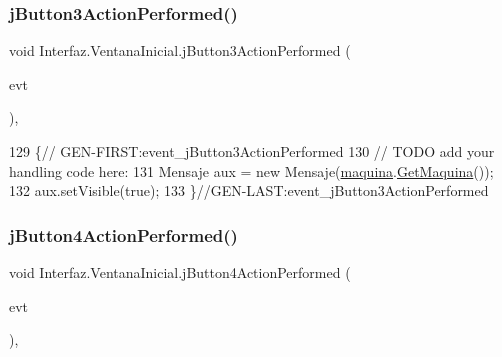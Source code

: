 \subsubsection{\texorpdfstring{j\+Button3\+Action\+Performed()}{jButton3ActionPerformed()}}
{\footnotesize\ttfamily void Interfaz.\+Ventana\+Inicial.\+j\+Button3\+Action\+Performed (\begin{DoxyParamCaption}\item[{java.\+awt.\+event.\+Action\+Event}]{evt }\end{DoxyParamCaption})\hspace{0.3cm}{\ttfamily [inline]}, {\ttfamily [private]}}


\begin{DoxyCode}
129                                                                          \{\textcolor{comment}{//
      GEN-FIRST:event\_jButton3ActionPerformed}
130         \textcolor{comment}{// TODO add your handling code here:}
131         Mensaje aux = \textcolor{keyword}{new} Mensaje(\mbox{\hyperlink{class_interfaz_1_1_ventana_inicial_a906577f94c1548333c5f598012939378}{maquina}}.\mbox{\hyperlink{classalgoritmia2_1_1_algoritmos_a0cefec1635c58223a5921e84a58e7bfe}{GetMaquina}}());
132         aux.setVisible(\textcolor{keyword}{true});
133     \}\textcolor{comment}{//GEN-LAST:event\_jButton3ActionPerformed}
\end{DoxyCode}
\mbox{\label{class_interfaz_1_1_ventana_inicial_a5ee4902a6b0e2dcfa91641cdef1b318b}} 
\subsubsection{\texorpdfstring{j\+Button4\+Action\+Performed()}{jButton4ActionPerformed()}}
{\footnotesize\ttfamily void Interfaz.\+Ventana\+Inicial.\+j\+Button4\+Action\+Performed (\begin{DoxyParamCaption}\item[{java.\+awt.\+event.\+Action\+Event}]{evt }\end{DoxyParamCaption})\hspace{0.3cm}{\ttfamily [inline]}, {\ttfamily [private]}}


